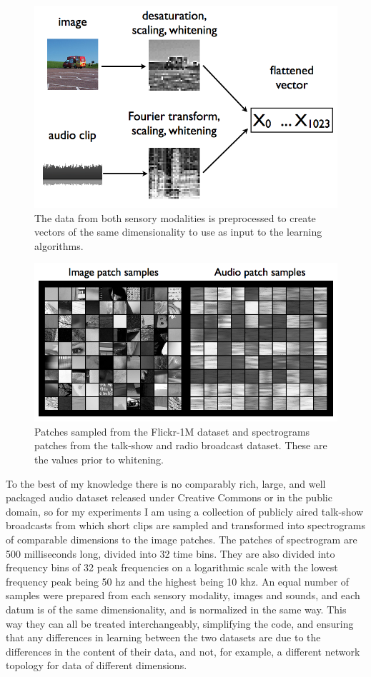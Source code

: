 \documentclass[12pt]{article}
\begin{document}
\begin{doublespacing}
\begin{figure}[p]
\centering
\includegraphics[width=6in]{key1002}
\caption{The data from both sensory modalities is preprocessed to create vectors of the same dimensionality to use as input to the learning algorithms.}
\end{figure}

\begin{figure}[p]
\centering
\includegraphics[width=6in]{patch_samples}
\caption{Patches sampled from the Flickr-1M dataset and spectrograms patches from the talk-show and radio broadcast dataset. These are the values prior to whitening.}
\label{fig:bothpatches}
\end{figure}
	
	To the best of my knowledge there is no comparably rich, large, and well packaged audio dataset released under Creative Commons or in the public domain, so for my experiments I am using a collection of publicly aired talk-show broadcasts from which short clips are sampled and transformed into spectrograms of comparable dimensions to the image patches. The patches of spectrogram are 500 milliseconds long, divided into 32 time bins. They are also divided into frequency bins of 32 peak frequencies on a logarithmic scale with the lowest frequency peak being 50 hz and the highest being 10 khz. An equal number of samples were prepared from each sensory modality, images and sounds, and each datum is of the same dimensionality, and is normalized in the same way. This way they can all be treated interchangeably, simplifying the code, and ensuring that any differences in learning between the two datasets are due to the differences in the content of their data, and not, for example, a different network topology for data of different dimensions.
	

\end{doublespacing}
\end{document}
